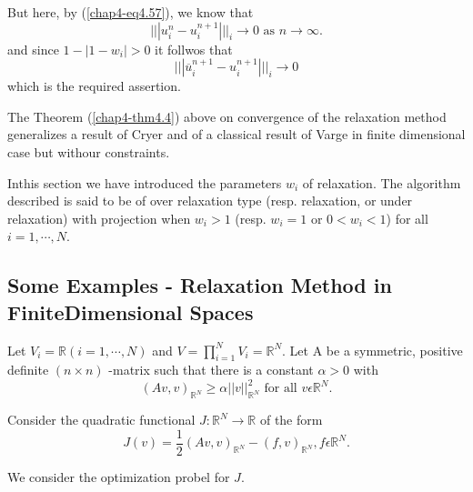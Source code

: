 But here, by (\ref{chap4-eq4.57}), we know that
$$
||| u_{i}^{n} - u_{i}^{n+1} |||_{i} \to 0 \text{ as } n \to \infty.
$$
and since $1 - |1-w_{i}| > 0$ it follwos that
$$
||| \overline{u}_{i}^{n+1} - u_{i}^{n+1} |||_{i} \to 0 
$$
which is the required assertion.

\begin{remark}\label{chap4-rem4.6}
The Theorem (\ref{chap4-thm4.4}) above on convergence of the relaxation method generalizes a result of Cryer \cite{key10} and of a classical result of Varge \cite{key50} in finite dimensional case but withour constraints.
\end{remark}

\begin{remark}\label{chap4-rem4.7}
In\pageoriginale this section we have introduced the parameters $w_{i}$ of relaxation. The algorithm described is said to be of over relaxation type (resp. relaxation, or under relaxation) with projection when $w_{i} > 1$ (resp. $w_{i} = 1$ or $0 < w_{i} < 1$) for all $i = 1, \cdots, N$.
\end{remark}

\subsection[Some Examples - Relaxation Method in Finite...]{Some
  Examples - Relaxation Method in Finite\hfil\break Dimensional
  Spaces}\label{chap4-subsec4.8} 

Let $V_{i} = \mathbb{R} (i = 1, \cdots , N)$ and $V = \prod_{i=1}^{N} V_{i} = \mathbb{R}^{N}$. Let A be a symmetric, positive definite $(n \times n)$ -matrix such that there is a constant $\alpha > 0$ with
\begin{equation*}
(Av, v)_{\mathbb{R}^{N}}  \geq \alpha ||v||_{\mathbb{R}^{N}}^{2} \text{ for all } v \epsilon \mathbb{R}^{N}.\tag{4.71}\label{chap4-eq4.71}
\end{equation*}

Consider the quadratic functional $J : \mathbb{R}^{N} \to \mathbb{R}$ of the form
\begin{equation*}
J(v) = \frac{1}{2} (Av, v)_{\mathbb{R}^{N}} - (f, v)_{\mathbb{R}^{N}}, f \epsilon \mathbb{R}^{N}.\tag{4.72}\label{chap4-eq4.72}
\end{equation*}

We consider the optimization probel for $J$.

